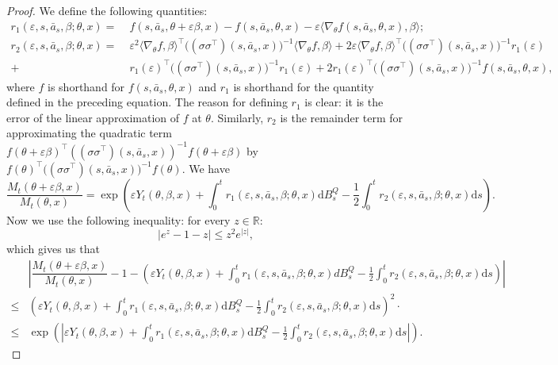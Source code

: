 \documentclass{article}
\newcommand{\eps}{\epsilon}
\newcommand{\1}{\mathbbm{1}}
\numberwithin{equation}{section}
\def\eps{\varepsilon}
\def\d{{\mathrm{d}}}
\begin{document}
\begin{proof}
We define the following quantities:
\begin{align}
r_{1}(\eps, s, \bar a_{s}, \beta;\theta, x)=\;&f(s, \bar a_{s}, \theta+\eps\beta, x)-f(s, \bar a_{s},\theta, x)-\eps\langle \nabla_{\theta} f(s, \bar a_{s},\theta, x), \beta\rangle;\\
r_{2}(\eps, s, \bar a_{s}, \beta;\theta, x)=\;&\eps^{2}\langle \nabla_{\theta} f, \beta\rangle^{\top}\big((\sigma\sigma^\top)(s, \bar a_{s},x)\big)^{-1}\langle \nabla_{\theta}f, \beta\rangle+2\eps\langle \nabla_{\theta} f, \beta\rangle^{\top}\big((\sigma\sigma^\top)(s, \bar a_{s},x)\big)^{-1}r_{1}(\eps)\nonumber\\
+&r_{1}(\eps)^{\top}\big((\sigma\sigma^\top)(s, \bar a_{s},x)\big)^{-1}r_{1}(\eps)+2r_{1}(\eps)^{\top}\big((\sigma\sigma^\top)(s, \bar a_{s},x)\big)^{-1}f(s, \bar a_{s}, \theta, x),
\end{align}
where $f$ is shorthand for $f(s, \bar a_{s}, \theta, x)$ and $r_{1}$ is shorthand for the quantity defined in the preceding equation. The reason for defining $r_{1}$ is clear: it is the error of the linear approximation of $f$ at $\theta$. Similarly, $r_{2}$ is the remainder term for approximating the quadratic term $f(\theta+\eps\beta)^{\top}((\sigma\sigma^\top)(s, \bar a_{s}, x))^{-1}f(\theta+\eps\beta)$ by $f(\theta)^{\top}\big((\sigma\sigma^\top)(s, \bar a_{s}, x)\big)^{-1}f(\theta)$. We have
$$\dfrac{M_{t}(\theta+\eps\beta, x)}{M_{t}(\theta, x)}=\exp\left(\eps Y_{t}(\theta, \beta, x)+\int_{0}^{t}r_{1}(\eps, s, \bar a_{s}, \beta;\theta, x)\d B_{s}^{Q}-\frac12\int_{0}^{t}r_{2}(\eps, s, \bar a_{s},\beta; \theta, x)\d s\right).$$
Now we use the following inequality: for every $z\in \mathbb{R}$:
$$|e^{z}-1-z|\leq z^{2}e^{|z|},$$
which gives us that
\begin{align*}
&\left|\dfrac{M_{t}(\theta+\eps\beta, x)}{M_{t}(\theta, x)}-1-\left(\eps Y_{t}(\theta, \beta, x)+\int_{0}^{t}r_{1}(\eps, s, \bar a_{s}, \beta;\theta, x)dB_{s}^{Q}-\frac12\int_{0}^{t}r_{2}(\eps, s, \bar a_{s},\beta; \theta, x)\d s\right)\right|\\
\leq&\left(\eps Y_{t}(\theta, \beta, x)+\int_{0}^{t}r_{1}(\eps, s, \bar a_{s}, \beta;\theta, x)\d B_{s}^{Q}-\frac12\int_{0}^{t}r_{2}(\eps, s, \bar a_{s},\beta; \theta, x)\d s\right)^{2}\cdot\\
\leq&\exp\left(\left|\eps Y_{t}(\theta, \beta, x)+\int_{0}^{t}r_{1}(\eps, s, \bar a_{s}, \beta;\theta, x)\d B_{s}^{Q}-\frac12\int_{0}^{t}r_{2}(\eps, s, \bar a_{s},\beta; \theta, x)\d s\right|\right).
\end{align*}


\end{proof}
\end{document}
